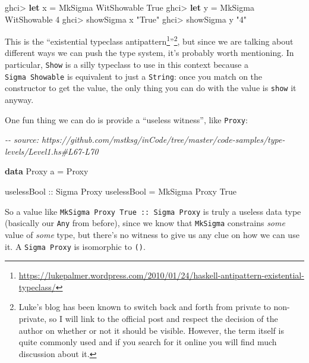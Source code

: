 \documentclass[]{article}
\newenvironment{Shaded}{}{}
\newcommand{\CommentTok}[1]{\textcolor[rgb]{0.38,0.63,0.69}{\textit{#1}}}
\newcommand{\DataTypeTok}[1]{\textcolor[rgb]{0.56,0.13,0.00}{#1}}
\newcommand{\DecValTok}[1]{\textcolor[rgb]{0.25,0.63,0.44}{#1}}
\newcommand{\KeywordTok}[1]{\textcolor[rgb]{0.00,0.44,0.13}{\textbf{#1}}}
\newcommand{\NormalTok}[1]{#1}
\newcommand{\OperatorTok}[1]{\textcolor[rgb]{0.40,0.40,0.40}{#1}}
\newcommand{\OtherTok}[1]{\textcolor[rgb]{0.00,0.44,0.13}{#1}}
\newcommand{\StringTok}[1]{\textcolor[rgb]{0.25,0.44,0.63}{#1}}
\renewcommand{\href}[2]{#2\footnote{\url{#1}}}
\begin{document}
\begin{Shaded}
\begin{Highlighting}[]
\NormalTok{ghci}\OperatorTok{\textgreater{}} \KeywordTok{let}\NormalTok{ x }\OtherTok{=} \DataTypeTok{MkSigma} \DataTypeTok{WitShowable} \DataTypeTok{True}
\NormalTok{ghci}\OperatorTok{\textgreater{}} \KeywordTok{let}\NormalTok{ y }\OtherTok{=} \DataTypeTok{MkSigma} \DataTypeTok{WitShowable} \DecValTok{4}
\NormalTok{ghci}\OperatorTok{\textgreater{}}\NormalTok{ showSigma x}
\StringTok{"True"}
\NormalTok{ghci}\OperatorTok{\textgreater{}}\NormalTok{ showSigma y}
\StringTok{"4"}
\end{Highlighting}
\end{Shaded}

This is the
``\href{https://lukepalmer.wordpress.com/2010/01/24/haskell-antipattern-existential-typeclass/}{existential
typeclass antipattern}''\footnote{Luke's blog has been known to switch back and
  forth from private to non-private, so I will link to the official post and
  respect the decision of the author on whether or not it should be visible.
  However, the term itself is quite commonly used and if you search for it
  online you will find much discussion about it.}, but since we are talking
about different ways we can push the type system, it's probably worth
mentioning. In particular, \texttt{Show} is a silly typeclass to use in this
context because a \texttt{Sigma\ Showable} is equivalent to just a
\texttt{String}: once you match on the constructor to get the value, the only
thing you can do with the value is \texttt{show} it anyway.

One fun thing we can do is provide a ``useless witness'', like \texttt{Proxy}:

\begin{Shaded}
\begin{Highlighting}[]
\CommentTok{{-}{-} source: https://github.com/mstksg/inCode/tree/master/code{-}samples/type{-}levels/Level1.hs\#L67{-}L70}

\KeywordTok{data} \DataTypeTok{Proxy}\NormalTok{ a }\OtherTok{=} \DataTypeTok{Proxy}

\OtherTok{uselessBool ::} \DataTypeTok{Sigma} \DataTypeTok{Proxy}
\NormalTok{uselessBool }\OtherTok{=} \DataTypeTok{MkSigma} \DataTypeTok{Proxy} \DataTypeTok{True}
\end{Highlighting}
\end{Shaded}

So a value like \texttt{MkSigma\ Proxy\ True\ ::\ Sigma\ Proxy} is truly a
useless data type (basically our \texttt{Any} from before), since we know that
\texttt{MkSigma} constrains \emph{some} value of \emph{some} type, but there's
no witness to give us any clue on how we can use it. A \texttt{Sigma\ Proxy} is
isomorphic to \texttt{()}.
\end{document}
